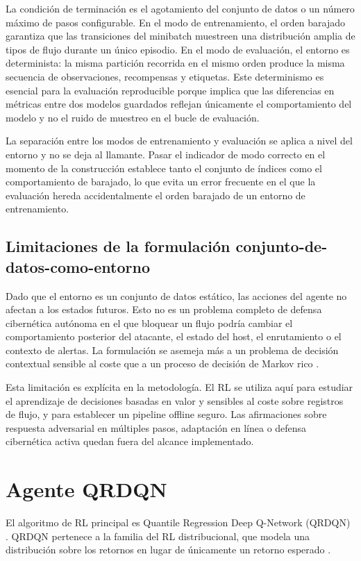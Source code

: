 La condición de terminación es el agotamiento del conjunto de datos o un número máximo de pasos configurable. En el modo de entrenamiento, el orden barajado garantiza que las transiciones del minibatch muestreen una distribución amplia de tipos de flujo durante un único episodio. En el modo de evaluación, el entorno es determinista: la misma partición recorrida en el mismo orden produce la misma secuencia de observaciones, recompensas y etiquetas. Este determinismo es esencial para la evaluación reproducible porque implica que las diferencias en métricas entre dos modelos guardados reflejan únicamente el comportamiento del modelo y no el ruido de muestreo en el bucle de evaluación.

La separación entre los modos de entrenamiento y evaluación se aplica a nivel del entorno y no se deja al llamante. Pasar el indicador de modo correcto en el momento de la construcción establece tanto el conjunto de índices como el comportamiento de barajado, lo que evita un error frecuente en el que la evaluación hereda accidentalmente el orden barajado de un entorno de entrenamiento.

\subsection{Limitaciones de la formulación conjunto-de-datos-como-entorno}
Dado que el entorno es un conjunto de datos estático, las acciones del agente no afectan a los estados futuros. Esto no es un problema completo de defensa cibernética autónoma en el que bloquear un flujo podría cambiar el comportamiento posterior del atacante, el estado del host, el enrutamiento o el contexto de alertas. La formulación se asemeja más a un problema de decisión contextual sensible al coste que a un proceso de decisión de Markov rico \parencite{SuttonBarto2018RL,Levine2020OfflineRL}.

Esta limitación es explícita en la metodología. El RL se utiliza aquí para estudiar el aprendizaje de decisiones basadas en valor y sensibles al coste sobre registros de flujo, y para establecer un pipeline offline seguro. Las afirmaciones sobre respuesta adversarial en múltiples pasos, adaptación en línea o defensa cibernética activa quedan fuera del alcance implementado.

\section{Agente QRDQN}
El algoritmo de RL principal es Quantile Regression Deep Q-Network (QRDQN) \parencite{Dabney2018QRDQN}. QRDQN pertenece a la familia del RL distribucional, que modela una distribución sobre los retornos en lugar de únicamente un retorno esperado \parencite{Bellemare2017DistributionalRL}.

